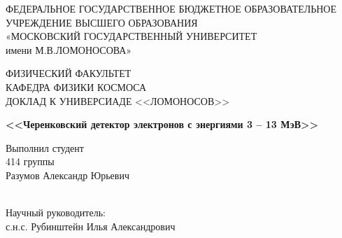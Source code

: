 \documentclass[12pt,a4paper]{report} %
\begin{document}
\setlength{\parindent}{1.25cm} %
\sloppy   %

\onehalfspacing   %
\renewcommand{\cftchapdotsep}{\cftdotsep} %

\renewcommand\bibname{СПИСОК ИСПОЛЬЗОВАННЫХ ИСТОЧНИКОВ}

\thispagestyle{empty}
\begin{titlepage}
\begin{center}
ФЕДЕРАЛЬНОЕ ГОСУДАРСТВЕННОЕ БЮДЖЕТНОЕ ОБРАЗОВАТЕЛЬНОЕ
УЧРЕЖДЕНИЕ ВЫСШЕГО ОБРАЗОВАНИЯ \\
«МОСКОВСКИЙ ГОСУДАРСТВЕННЫЙ УНИВЕРСИТЕТ\\
имени М.В.ЛОМОНОСОВА»
\vspace{1cm}

ФИЗИЧЕСКИЙ ФАКУЛЬТЕТ\\
\vspace{1cm}
КАФЕДРА ФИЗИКИ КОСМОСА\\

\vspace{1cm}
ДОКЛАД К УНИВЕРСИАДЕ <<ЛОМОНОСОВ>>\\
\vspace{1cm}

\textbf{<<Черенковский детектор электронов с энергиями 3 -- 13 МэВ>>}


\end{center}


\begin{flushright}
\vspace{1cm}

Выполнил студент \\
414 группы\\

Разумов Александр Юрьевич\\

\underline{\hspace{3cm}}\\ %

\vspace{1cm}

Научный руководитель:\\
с.н.с. Рубинштейн Илья Александрович\\
\underline{\hspace{3cm}}\\
 

\end{flushright}
\end{titlepage}
\end{document}
